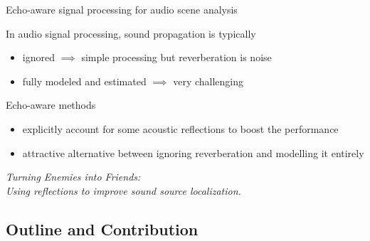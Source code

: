 \begin{frame}{\alert{Echo-aware} signal processing for audio scene analysis}


    \begin{block}{}
        In audio signal processing, sound propagation is typically
        \begin{itemize}
            \item \alert{ignored} $\implies$ simple processing but reverberation is noise
            \item \alert{fully modeled} and estimated $\implies$ very challenging
        \end{itemize}
    \end{block}

    \begin{mydefblock}{Echo-aware methods}
        \begin{itemize}
            \item explicitly account for some acoustic reflections to boost the performance
            \item attractive alternative between ignoring reverberation and modelling it entirely
        \end{itemize}
        \begin{center}
            \textit{Turning Enemies into Friends:
            \\Using reflections to improve sound source localization.}
        \end{center}
        \hfill \cite{ribeiro2010turning}
    \end{mydefblock}



\end{frame}

\subsection*{Outline and Contribution}

